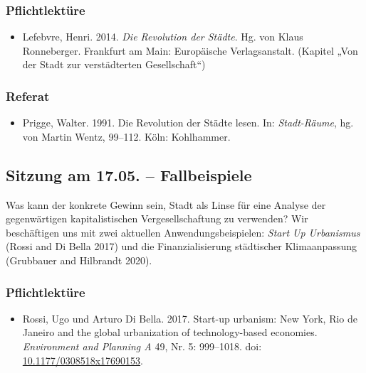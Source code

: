 \documentclass[
]{article}
\providecommand{\tightlist}{%
  \setlength{\itemsep}{0pt}\setlength{\parskip}{0pt}}
\begin{document}
\hypertarget{pflichtlektuxfcre-2}{%
\subsubsection*{Pflichtlektüre}\label{pflichtlektuxfcre-2}}

\begin{itemize}
\tightlist
\item
  Lefebvre, Henri. 2014. \emph{Die Revolution der Städte}. Hg. von Klaus Ronneberger. Frankfurt am Main: Europäische Verlagsanstalt. (Kapitel „Von der Stadt zur verstädterten Gesellschaft``)
\end{itemize}

\hypertarget{referat-2}{%
\subsubsection*{Referat}\label{referat-2}}

\begin{itemize}
\tightlist
\item
  Prigge, Walter. 1991. Die Revolution der Städte lesen. In: \emph{Stadt-Räume}, hg. von Martin Wentz, 99--112. Köln: Kohlhammer.
\end{itemize}

\hypertarget{sitzung-am-17.05.-fallbeispiele}{%
\subsection{Sitzung am 17.05. -- Fallbeispiele}\label{sitzung-am-17.05.-fallbeispiele}}

Was kann der konkrete Gewinn sein, Stadt als Linse für eine Analyse der gegenwärtigen kapitalistischen Vergesellschaftung zu verwenden? Wir beschäftigen uns mit zwei aktuellen Anwendungsbeispielen: \emph{Start Up Urbanismus} (Rossi and Di Bella 2017) und die Finanzialisierung städtischer Klimaanpassung (Grubbauer and Hilbrandt 2020).

\hypertarget{pflichtlektuxfcre-3}{%
\subsubsection*{Pflichtlektüre}\label{pflichtlektuxfcre-3}}

\begin{itemize}
\tightlist
\item
  Rossi, Ugo und Arturo Di Bella. 2017. Start-up urbanism: New York, Rio de Janeiro and the global urbanization of technology-based economies. \emph{Environment and Planning A} 49, Nr. 5: 999--1018. doi: \href{https://doi.org/10.1177/0308518x17690153}{10.1177/0308518x17690153}.
\end{itemize}
\end{document}
